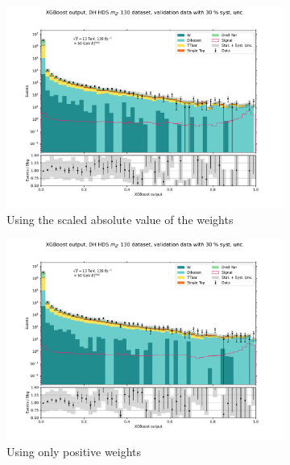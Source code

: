 \documentclass[12pt, a4paper]{book}
\begin{document}
\graphicspath{{../../../Plots/XGBoost/WEIGHT_TEST/DH_HDS_mZp_130/}}
\begin{figure}[!ht]
	\centering
	\begin{subfigure}[b]{0.49\textwidth}
      \centering
      \includegraphics[width=1\textwidth]{ATLAS_ABS/VAL.pdf}
      \caption{Using the scaled absolute value of the weights}
   \end{subfigure}
   \begin{subfigure}[b]{0.49\textwidth}
      \centering
      \includegraphics[width=1\textwidth]{POS/VAL.pdf}
      \caption{Using only positive weights}
   \end{subfigure}
   \begin{subfigure}[b]{0.49\textwidth}
      \centering

\end{subfigure}
\end{figure}
\end{document}
